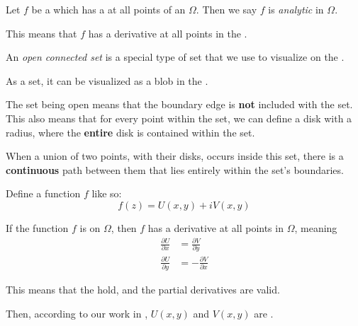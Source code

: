 \begin{definition}[Analytic]\label{def:Analytic}
  Let $f$ be a  which has a  at all points of an  $\Omega$.
  Then we say $f$ is \emph{analytic} in $\Omega$.

  This means that $f$ has a derivative at all points in the .
\end{definition}

\begin{definition}\label{def:Open_Connected_Set}
  An \emph{open connected set} is a special type of set that we use to visualize on the .
  \begin{description}[noitemsep]
  \item[Set:] As a set, it can be visualized as a blob in the .
  \item[Open:] The set being open means that the boundary edge is \textbf{not} included with the set.
    This also means that for every point within the set, we can define a disk with a radius, where the \textbf{entire} disk is contained within the set.
  \item[Connected:] When a union of two points, with their disks, occurs inside this set, there is a \textbf{continuous} path between them that lies entirely within the set's boundaries.
  \end{description}
\end{definition}

\begin{theorem}
  Define a function $f$ like so:
  \begin{equation*}
    f(z) = U(x, y) + i V(x, y)
  \end{equation*}

  If the function $f$ is  on $\Omega$, then $f$ has a derivative at all points in $\Omega$, meaning
  \begin{align*}
    \frac{\partial U}{\partial x} &= \frac{\partial V}{\partial y} \\
    \frac{\partial U}{\partial y} &= -\frac{\partial V}{\partial x}
  \end{align*}

  This means that the  hold, and the partial derivatives are valid.

  Then, according to our work in , $U(x, y)$ and $V(x, y)$ are .
\end{theorem}

